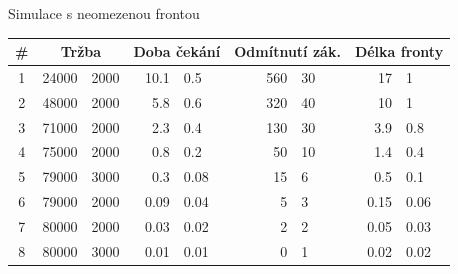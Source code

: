 \begin{frame}{Simulace s neomezenou frontou}
\small
\begin{tabular}{c|r@{$\pm$}l|r@{$\pm$}l|r@{$\pm$}l|r@{$\pm$}l}
	\#  & \multicolumn{2}{|c|}{Tržba} & \multicolumn{2}{|c|}{Doba čekání} & \multicolumn{2}{|c|}{Odmítnutí zák.} & \multicolumn{2}{|c}{Délka fronty}\\ \hline\hline	
	1 &   24000 & 2000  &   10.1  &  0.5   &  560 & 30  &  17    & 1    \\
	2 &   48000 & 2000  &    5.8  &  0.6   &  320 & 40  &  10    & 1    \\
	3 &   71000 & 2000  &    2.3  &  0.4   &  130 & 30  &   3.9  & 0.8  \\
	4 &   75000 & 2000  &    0.8  &  0.2   &   50 & 10  &   1.4  & 0.4  \\
	5 &   79000 & 3000  &    0.3  &  0.08  &   15 &  6  &   0.5  & 0.1  \\
	6 &   79000 & 2000  &    0.09 &  0.04  &    5 &  3  &   0.15 & 0.06 \\
	7 &   80000 & 2000  &    0.03 &  0.02  &    2 &  2  &   0.05 & 0.03 \\
	8 &   80000 & 3000  &    0.01 &  0.01  &    0 &  1  &   0.02 & 0.02 
\end{tabular}
\normalsize
\end{frame}
